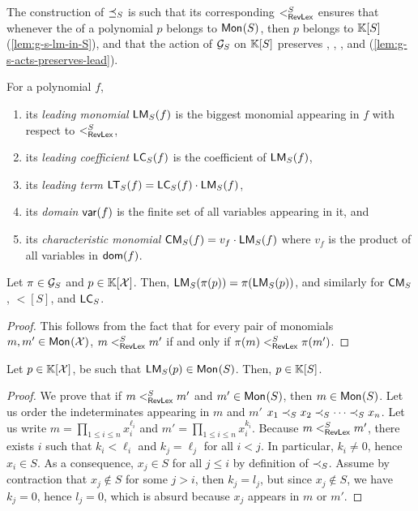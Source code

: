 \AP The construction of $\sOrderLeq$ is such that its corresponding
 $\revlex[S]$ ensures that whenever the  of a polynomial $p$ belongs to $\mon{S}$, then $p$ belongs to
$\poly{\K}{S}$ (\cref{lem:g-s-lm-in-S}), and that the action of $\group_S$ on
$\poly{\K}{S}$ preserves , ,
, and 
(\cref{lem:g-s-acts-preserves-lead}).
%
\begin{definition}\label{def:LM T}
For a polynomial $f$,
\begin{enumerate}
    \item its \emph{leading monomial} $\lm[S](f)$ is the biggest monomial appearing in $f$ with respect to $\revlex[S]$,
    \item its \emph{leading coefficient} $\lc[S](f)$ is the coefficient of $\lm[S](f)$,
    \item its \emph{leading term} $\lt[S](f) = \lc[S](f)\cdot\lm[S](f)$,
    \item its \emph{domain} $\var(f)$ is the finite set of all variables appearing in it, and
    \item its \emph{characteristic monomial} $\cm[S](f) = v_f \cdot \lm[S](f)$ where $v_f$ is the product of all variables in $\dom(f)$.
\end{enumerate}
\end{definition}
%
%
\begin{lemma}
    \label{lem:g-s-acts-preserves-lead}
    Let $\pi \in \group_S$ and $p \in \poly{\K}{\X}$.
    Then, $\lm[S](\pi(p)) = \pi(\lm[S](p))$,
    and similarly for $\cm[S]$, $\lt[S]$, and $\lc[S]$.
\end{lemma}
\begin{proof}
    This follows from the fact that for every pair of monomials
    $m,m' \in \mon{\X}$,
    $m \revlex[S] m'$ if and only if $\pi(m) \revlex[S] \pi(m')$.
\end{proof}

\begin{lemma}
    \label{lem:g-s-lm-in-S}
    Let $p \in \poly{\K}{\X}$,
    be such that $\lm[S](p) \in \mon{S}$.
    Then, $p \in \poly{\K}{S}$.
\end{lemma}
\begin{proof}
    We prove that if $m \revlex[S] m'$ and $m' \in \mon{S}$, then $m \in
    \mon{S}$. Let us order the indeterminates appearing in $m$ and $m'$ $x_1
    \sOrderLt x_2 \sOrderLt \cdots \sOrderLt x_n$. Let us write $m = \prod_{1
    \leq i \leq n} x_i^{\ell_i}$ and $m' = \prod_{1 \leq i \leq n} x_i^{k_i}$.
    Because $m \revlex[S] m'$, there exists $i$ such that $k_i < \ell_i$ and
    $k_j = \ell_j$ for all $i < j$. In particular, $k_i \neq 0$, hence $x_i \in
    S$. As a consequence, $x_j \in S$ for all $j \leq i$ by definition of
    $\sOrderLt$. Assume by contraction that $x_j \not\in S$ for some $j > i$,
    then $k_j = l_j$, but since $x_j \not\in S$, we have $k_j = 0$, hence $l_j
    = 0$, which is absurd because $x_j$ appears in $m$ or $m'$.
\end{proof}

